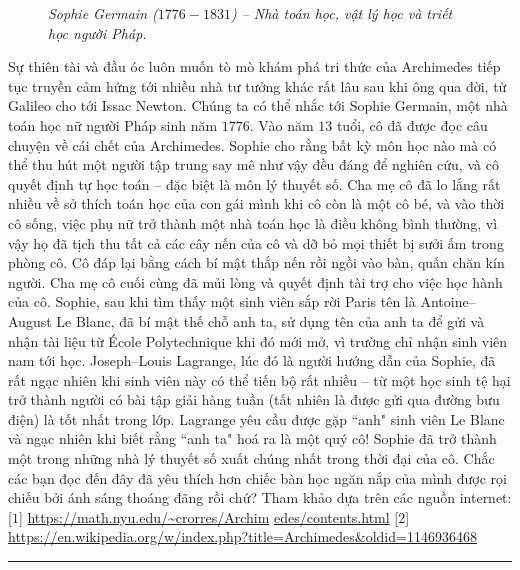 \begin{multicols}{2}
\begin{figure}[H]
		\caption{\small\textit{\color{quantoan}Sophie Germain ($1776-1831$) -- Nhà toán học, vật lý học và triết học người Pháp.}}
		\vspace*{-10pt}
	\end{figure}
	Sự thiên tài và đầu óc luôn muốn tò mò khám phá tri thức của Archimedes tiếp tục truyền cảm hứng tới nhiều nhà tư tưởng khác rất lâu sau khi ông qua đời, từ Galileo cho tới Issac Newton. Chúng ta có thể nhắc tới Sophie Germain, một nhà toán học nữ người Pháp sinh năm $1776$. Vào năm $13$ tuổi, cô đã được đọc câu chuyện về cái chết của Archimedes. Sophie cho rằng bất kỳ môn học nào mà có thể thu hút một người tập trung say mê như vậy đều đáng để nghiên cứu, và cô quyết định tự học toán -- đặc biệt là môn lý thuyết số. Cha mẹ cô đã lo lắng rất nhiều về sở thích toán học của con gái mình khi cô còn là một cô bé, và vào thời cô sống, việc phụ nữ trở thành một nhà toán học là điều không bình thường, vì vậy họ đã tịch thu tất cả các cây nến của cô và dỡ bỏ mọi thiết bị sưởi ấm trong phòng cô. Cô đáp lại bằng cách bí mật thắp nến rồi ngồi vào bàn, quấn chăn kín người. Cha mẹ cô cuối cùng đã mủi lòng và quyết định tài trợ cho việc học hành của cô. Sophie, sau khi tìm thấy một sinh viên sắp rời Paris tên là Antoine--August Le Blanc, đã bí mật thế chỗ anh ta, sử dụng tên của anh ta để gửi và nhận tài liệu từ École Polytechnique khi đó mới mở,  vì trường chỉ nhận sinh viên nam tới học. Joseph--Louis Lagrange, lúc đó là người hướng dẫn của Sophie, đã rất ngạc nhiên khi  sinh viên này có thể tiến bộ rất nhiều -- từ một học sinh tệ hại trở thành người có bài tập giải hàng tuần (tất nhiên là được gửi qua đường bưu điện) là tốt nhất trong lớp. Lagrange yêu cầu được gặp ``anh" sinh viên Le Blanc và ngạc nhiên khi biết rằng ``anh ta" hoá ra là một quý cô! Sophie đã trở thành một trong những nhà lý thuyết số xuất chúng nhất trong thời đại của cô.
	\vskip 0.1cm
	Chắc các bạn đọc đến đây đã yêu thích hơn chiếc bàn học ngăn nắp của mình được rọi chiếu bởi ánh sáng thoáng đãng rồi chứ?
	\vskip 0.1cm
	Tham khảo dựa trên các nguồn internet:
	\vskip 0.1cm
	[$1$]	\url{https://math.nyu.edu/~crorres/Archim} \linebreak\url{edes/contents.html}
	\vskip 0.1cm
	[$2$]	\url{https://en.wikipedia.org/w/index.php?title=Archimedes&oldid=1146936468}
\end{multicols}
\vspace*{-10pt}
{\color{quantoan}\rule{1\linewidth}{0.1pt}}
\begingroup

